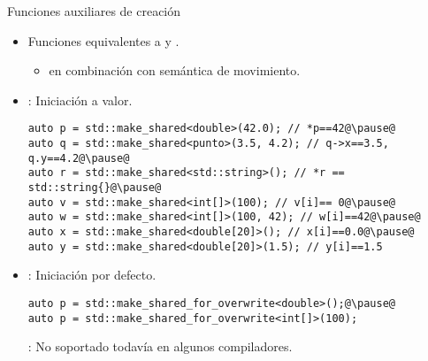 \begin{frame}[t,fragile]{Funciones auxiliares de creación}
  \begin{itemize}
    \item Funciones equivalentes a 
           y 
          .
      \begin{itemize}
        \item {} en combinación con semántica de movimiento.
      \end{itemize}

    \item {}: Iniciación a valor.
\begin{lstlisting}[escapechar=@]
auto p = std::make_shared<double>(42.0); // *p==42@\pause@
auto q = std::make_shared<punto>(3.5, 4.2); // q->x==3.5, q.y==4.2@\pause@
auto r = std::make_shared<std::string>(); // *r == std::string{}@\pause@
auto v = std::make_shared<int[]>(100); // v[i]== 0@\pause@
auto w = std::make_shared<int[]>(100, 42); // w[i]==42@\pause@
auto x = std::make_shared<double[20]>(); // x[i]==0.0@\pause@
auto y = std::make_shared<double[20]>(1.5); // y[i]==1.5
\end{lstlisting}

    \item {}: Iniciación por defecto.
\begin{lstlisting}[escapechar=@]
auto p = std::make_shared_for_overwrite<double>();@\pause@
auto p = std::make_shared_for_overwrite<int[]>(100);
\end{lstlisting}
: No soportado todavía en algunos compiladores.
  \end{itemize}
\end{frame}

